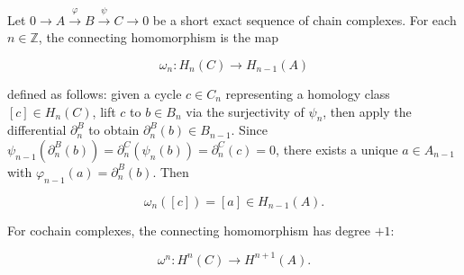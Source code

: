 Let $0 \to A \xrightarrow{\varphi} B \xrightarrow{\psi} C \to 0$ be a short exact sequence of chain complexes. For each $n \in \mathbb{Z}$, the connecting homomorphism is the map

\[
\omega_n : H_n(C) \to H_{n-1}(A)
\]

defined as follows: given a cycle $c \in C_n$ representing a homology class $[c] \in H_n(C)$, lift $c$ to $b \in B_n$ via the surjectivity of $\psi_n$, then apply the differential $\partial^B_n$ to obtain $\partial^B_n(b) \in B_{n-1}$. Since $\psi_{n-1}(\partial^B_n(b)) = \partial^C_n(\psi_n(b)) = \partial^C_n(c) = 0$, there exists a unique $a \in A_{n-1}$ with $\varphi_{n-1}(a) = \partial^B_n(b)$. Then

\[
\omega_n([c]) = [a] \in H_{n-1}(A).
\]

For cochain complexes, the connecting homomorphism has degree $+1$:

\[
\omega^n : H^n(C) \to H^{n+1}(A).
\]
